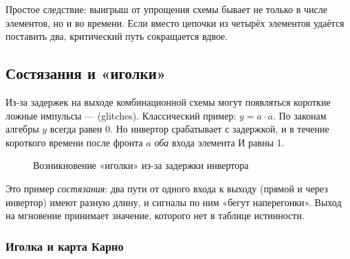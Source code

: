 Простое следствие: выигрыш от упрощения схемы бывает не только в числе
элементов, но и во времени. Если вместо цепочки из четырёх элементов
удаётся поставить два, критический путь сокращается вдвое.

\subsection{Состязания и «иголки»}

Из-за задержек на выходе комбинационной схемы могут появляться короткие
ложные импульсы ---  (glitches). Классический пример:
$y = a\cdot\overline{a}$. По законам алгебры $y$ всегда равен 0. Но инвертор
срабатывает с задержкой, и в течение короткого времени после фронта $a$
\emph{оба} входа элемента И равны 1.

\begin{figure}[H]
\centering
{}
\caption{Возникновение «иголки» из-за задержки инвертора}
\end{figure}

Это пример \emph{состязания}: два пути от одного входа к выходу (прямой и
через инвертор) имеют разную длину, и сигналы по ним «бегут наперегонки».
Выход на мгновение принимает значение, которого нет в таблице истинности.

\subsubsection{Иголка и карта Карно}


